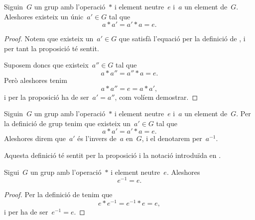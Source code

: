 \documentclass[../../main.tex]{subfiles}
\begin{document}
    \begin{proposition}
        \label{prop:unicitat inversa en grups}
        Siguin~\(G\) un grup amb l'operació~\(\ast\) i element neutre~\(e\) i~\(a\) un element de~\(G\).
        Aleshores existeix un únic~\(a'\in G\) tal que
        \[
            a\ast a'=a'\ast a=e.
        \]
        \begin{proof}
            Notem que existeix un~\(a'\in G\) que satisfà l'equació per la definició de , i per tant la proposició té sentit.

            Suposem doncs que existeix~\(a''\in G\) tal que
            \[
                a\ast a''=a''\ast a=e.
            \]
            Però aleshores tenim
            \[
                a\ast a''=e=a\ast a',
            \]
            i per la proposició  ha de ser~\(a'=a''\), com volíem demostrar.
        \end{proof}
    \end{proposition}
    \begin{definition}
        \label{def:l'invers d'un element d'un grup}
        Siguin~\(G\) un grup amb l'operació~\(\ast\) i element neutre~\(e\) i~\(a\) un element de~\(G\).
        Per la definició de grup tenim que existeix un~\(a'\in G\) tal que
        \[
            a\ast a'=a'\ast a=e.
        \]
        Aleshores direm que~\(a'\) és l'invers de~\(a\) en~\(G\), i el denotarem per~\(a^{-1}\).

        Aquesta definició té sentit per la proposició  i la notació introduïda en .
    \end{definition}
    \begin{proposition}
        \label{prop:l'invers de l'element neutre d'un grup és ell mateix}
        Sigui~\(G\) un grup amb l'operació~\(\ast\) i element neutre~\(e\).
        Aleshores
        \[
            e^{-1}=e.
        \]
        \begin{proof}
            Per la definició de  tenim que
            \[
                e\ast e^{-1}=e^{-1}\ast e=e,
            \]
            i per ha de ser~\(e^{-1}=e\).
        \end{proof}
    \end{proposition}
\end{document}
